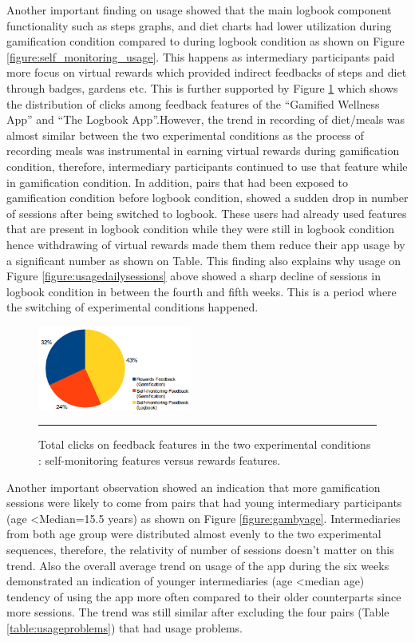 \documentclass{sig-alternate}
\begin{document}
Another important finding on usage showed that the main logbook component functionality such as steps graphs, and diet charts had lower utilization during gamification condition compared to during logbook condition as shown on Figure \ref{figure:self_monitoring_usage}. This happens as intermediary participants paid more focus on virtual rewards which provided indirect feedbacks of steps and diet through badges, gardens etc. This is further supported by Figure \ref{figure:clicks_distr} which shows the distribution of clicks among feedback features of the ``Gamified Wellness App'' and ``The Logbook App''.\newline  However, the trend in recording of diet/meals was almost similar between the two experimental conditions as the process of recording meals was instrumental in earning virtual rewards during gamification condition, therefore, intermediary participants continued to use that feature while in gamification condition. In addition, pairs that had been exposed to gamification condition before logbook condition, showed a sudden drop in number of sessions after being switched to logbook. These users had already used features that are present in logbook condition while they were still in logbook condition hence withdrawing of virtual rewards made them them reduce their app usage by a significant number  as shown on Table.  This finding also explains why usage on Figure \ref{figure:usagedailysessions} above showed a sharp decline of sessions in logbook condition in between the fourth and fifth weeks. This is a period where the switching of experimental conditions happened.\newline
\begin{figure}[htbp]
  \centering
    \includegraphics[width=0.45\textwidth]{clicks_distr.png}
    \rule{26em}{0.5pt}
  \caption{Total clicks on feedback features in the two experimental conditions : self-monitoring features versus rewards features.}
  \label{figure:clicks_distr}
\end{figure}\newline
Another important observation showed an indication that more gamification sessions were likely to come from pairs that had young intermediary participants (age \textless Median=15.5 years) as shown on Figure \ref{figure:gambyage}. Intermediaries from both age group were distributed almost evenly to the two experimental sequences, therefore, the relativity of number of sessions doesn't matter on this trend. Also the overall average trend on usage of the app during the six weeks demonstrated an indication of younger intermediaries (age \textless median age) tendency of using the app more often compared  to their older counterparts since more sessions. The trend was still similar after excluding the four pairs (Table \ref{table:usageproblems}) that had usage problems.\newline
\end{document}
